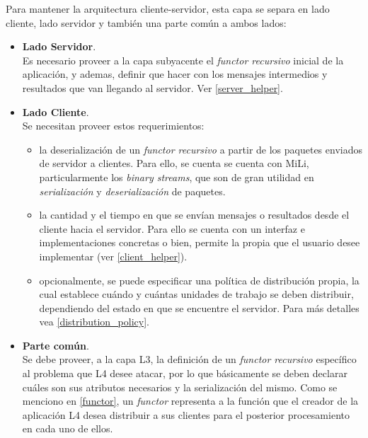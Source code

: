 Para mantener la arquitectura cliente-servidor, esta capa se separa en lado cliente, lado servidor y también una parte común a ambos lados:
\begin{itemize}
    \item   \textbf{Lado Servidor}.\\
            Es necesario proveer a la capa subyacente el \textit{functor recursivo} inicial de la aplicación, y ademas, definir que hacer  
            con los mensajes intermedios y resultados que van llegando al servidor. Ver \ref{server_helper}.
    \item   \textbf{Lado Cliente}.\\
            Se necesitan proveer estos requerimientos:
            \begin{itemize}
                \item   la deserialización de un \textit{functor recursivo} a partir de los paquetes enviados de servidor a clientes. Para
                        ello, se cuenta se cuenta con MiLi, particularmente los \textit{binary streams}, que son de gran utilidad en
                        \textit{serialización} y \textit{deserialización} de paquetes.
                \item   la cantidad y el tiempo en que se envían mensajes o resultados desde el cliente hacia el servidor. Para ello se
                        cuenta con un interfaz e implementaciones concretas o bien, permite la propia que el usuario desee implementar (ver
                        \ref{client_helper}).
                \item   opcionalmente, se puede especificar una política de distribución propia, la cual establece cuándo y cuántas unidades
                        de trabajo se deben distribuir, dependiendo del estado en que se encuentre el servidor. Para más detalles vea
                        \ref{distribution_policy}.
            \end{itemize}
    \item   \textbf{Parte común}.\\
            Se debe proveer, a la capa L3, la definición de un \textit{functor recursivo} específico al problema que L4 desee atacar, por lo
            que básicamente se deben declarar cuáles son sus atributos necesarios y la serialización del mismo. Como se menciono en         
            \ref{functor}, un \textit{functor} representa a la función que el creador de la aplicación L4 desea distribuir a sus clientes
            para el posterior procesamiento en cada uno de ellos.
\end{itemize}


